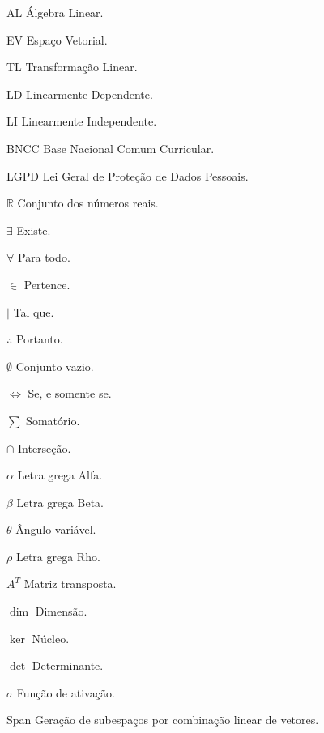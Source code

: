 \documentclass[
12pt,
 a4paper,
    english,
    brazil,
    oneside
    ]{abntex2}
\begin{document}
	
	\listoffigures*
	\cleardoublepage
	
	
	\listoftables*
	\cleardoublepage
	
	\begin{siglas}
		\item[AL] Álgebra Linear.
		\item[EV] Espaço Vetorial.
		\item[TL] Transformação Linear.
		\item[LD] Linearmente Dependente.
		\item[LI] Linearmente Independente.
		\item[BNCC] Base Nacional Comum Curricular.
		\item[LGPD] Lei Geral de Proteção de Dados Pessoais.
	\end{siglas}
	
	\begin{simbolos}
		\item[$ \mathbb{R} $] Conjunto dos números reais.
		\item[$\exists$] Existe.
		\item[$\forall$] Para todo.
		\item[$\in$] Pertence.
		\item[$\mid$] Tal que.
		\item[$\therefore$] Portanto.
		\item[$\emptyset$] Conjunto vazio.
		\item[$\iff$] Se, e somente se.
		\item[$\sum$] Somatório.
		\item[$\cap$] Interseção.
		\item[$\alpha$] Letra grega Alfa.
		\item[$\beta$] Letra grega Beta.
		\item[$\theta$] Ângulo variável.
		\item[$\rho$] Letra grega Rho.
		\item[$A^T$] Matriz transposta.
		\item[$\dim$] Dimensão.
		\item[$\ker$] Núcleo.
		\item[$\det$] Determinante.
		\item[$\sigma$] Função de ativação.
		\item[Span] Geração de subespaços por combinação linear de vetores.
	\end{simbolos}
	
\end{document}
